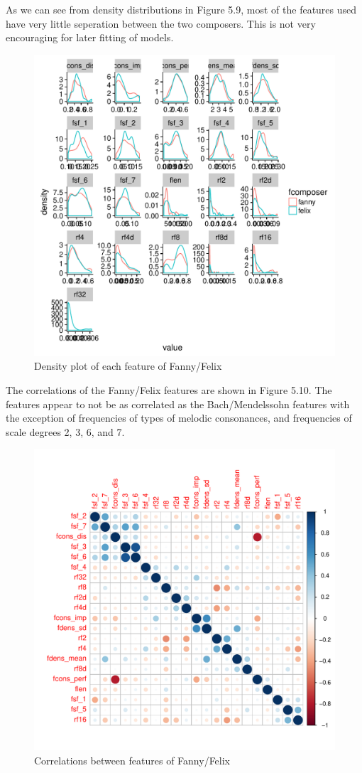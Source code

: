 \documentclass[12pt,twoside]{reedthesis}
\theoremstyle{definition}
\theoremstyle{definition}
\theoremstyle{definition}
\theoremstyle{remark}
\begin{document}
As we can see from density distributions in Figure 5.9, most of the
features used have very little seperation between the two composers.
This is not very encouraging for later fitting of models.
\begin{figure}[H]
\centering
\includegraphics[scale = .5]{images/distribution_f.pdf}
\caption{Density plot of each feature of Fanny/Felix}
\label{subd}
\end{figure}
The correlations of the Fanny/Felix features are shown in Figure 5.10.
The features appear to not be as correlated as the Bach/Mendelssohn
features with the exception of frequencies of types of melodic
consonances, and frequencies of scale degrees 2, 3, 6, and 7.
\begin{figure}[H]
\centering
\includegraphics[scale = .5]{images/cor_circles_f.pdf}
\caption{Correlations between features of Fanny/Felix}
\label{subd}
\end{figure}
\end{document}
